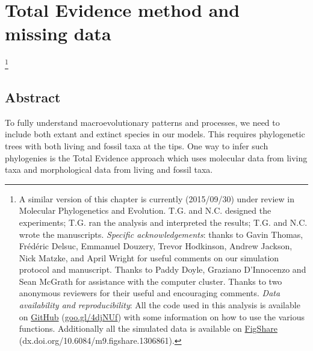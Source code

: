 

%
%

\chapter[Total Evidence method and missing data]{Total Evidence method and missing data}
\label{chap:TEM_paper}

\bigskip
\medskip
\begin{center}

\footnote{A similar version of this chapter is currently (2015/09/30) under review in Molecular Phylogenetics and Evolution. T.G. and N.C. designed the experiments; T.G. ran the analysis and interpreted the results; T.G. and N.C. wrote the manuscripts. \textit{Specific acknowledgements}: thanks to Gavin Thomas, Fr\'{e}d\'{e}ric Delsuc, Emmanuel Douzery, Trevor Hodkinson, Andrew Jackson, Nick Matzke, and April Wright for useful comments on our simulation protocol and manuscript. Thanks to Paddy Doyle, Graziano D'Innocenzo and Sean McGrath for assistance with the computer cluster. Thanks to two anonymous reviewers for their useful and encouraging comments. \textit{Data availability and reproducibility}: All the code used in this analysis is available on \href{https://github.com/TGuillerme/Total_Evidence_Method-Missing_data}{GitHub} (\href{https://github.com/TGuillerme/Total_Evidence_Method-Missing_data}{goo.gl/4djNUf}) with some information on how to use the various functions. Additionally all the simulated data is available on \href{http://figshare.com/articles/Effect_of_missing_data_on_topological_inference_using_a_total_evidence_approach/1306861}{FigShare} (dx.doi.org/10.6084/m9.figshare.1306861).} \\

\end{center}
%
%
\section*{Abstract}
To fully understand macroevolutionary patterns and processes, we need to include both extant and extinct species in our models.
This requires phylogenetic trees with both living and fossil taxa at the tips.
One way to infer such phylogenies is the Total Evidence approach which uses molecular data from living taxa and morphological data from living and fossil taxa.

